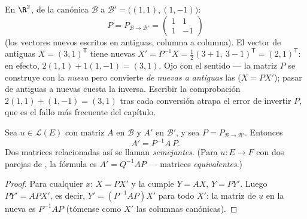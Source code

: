 \begin{example}
\label{ex:b1:matrices:changerun}
En $\R^2$, de la canónica $\mathcal B$ a
$\mathcal B' = \bigl((1,1), (1,-1)\bigr)$:
\[
P = P_{\mathcal B\to\mathcal B'} =
\begin{pmatrix} 1 & 1\\ 1 & -1 \end{pmatrix}
\]
(los vectores nuevos escritos en  antiguas, columna a
columna). El vector de  antiguas
$X = (3, 1)^{\mathsf T}$ tiene  nuevas
$X' = P^{-1}X = \frac12(3 + 1,\ 3 - 1)^{\mathsf T} =
(2, 1)^{\mathsf T}$: en efecto, $2(1,1) + 1(1,-1) = (3,1)$. Ojo con
el sentido --- la matriz $P$ se construye con la  \emph{nueva}
pero convierte \emph{de nuevas a antiguas} las 
($X = PX'$); pasar de antiguas a nuevas cuesta la inversa. Escribir
la comprobación $2(1,1) + (1,-1) = (3,1)$ tras cada conversión atrapa
el error de invertir $P$, que es el fallo más frecuente del capítulo.
\end{example}

\begin{theorem}\label{thm:b1:matrices:conjugation}
Sea $u \in \mathcal{L}(E)$ con matriz $A$ en $\mathcal{B}$ y $A'$ en
$\mathcal{B}'$, y sea $P = P_{\mathcal{B}\to\mathcal{B}'}$. Entonces
\[
A' = P^{-1} A\, P .
\]
Dos matrices relacionadas así se llaman
\emph{semejantes}. (Para
$u \colon E \to F$ con dos parejas de , la fórmula es
$A' = Q^{-1} A P$ --- matrices \emph{equivalentes}.)
\end{theorem}

\begin{proof}
Para cualquier $x$: $X = PX'$ y la  cumple $Y = AX$,
$Y = PY'$. Luego $PY' = APX'$, es decir, $Y' = (P^{-1}AP)X'$ para
todo $X'$: la matriz de $u$ en la  nueva es $P^{-1}AP$ (tómense
como $X'$ las columnas canónicas).
\end{proof}

